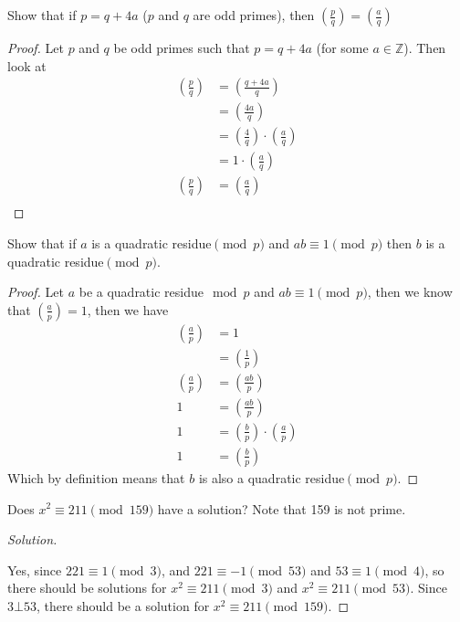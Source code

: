 \documentclass[11pt]{article}
\newcommand{\Z}{\mathbb{Z}}
\newcommand\leg[2]{\left(\frac{#1}{#2}\right)}
\newenvironment{problem}[2][Problem]{\begin{trivlist}
\item[\hskip \labelsep {\bfseries #1}\hskip \labelsep {\bfseries #2.}]}{\end{trivlist}}
\newenvironment{solution}
  {\renewcommand\qedsymbol{$~$}\begin{proof}[Solution]$ $\par\nobreak\ignorespaces}
  {\end{proof}}
\begin{document}
\begin{problem}{11}
Show that if $p=q+4a$ ($p$ and $q$  are odd primes), then $\leg{p}{q}=\leg{a}{q}$
\end{problem}

\begin{proof}
  Let $p$ and $q$ be odd primes such that $p=q+4a$ (for some $a\in \Z$). Then look at
  \begin{align*}
    \leg{p}{q} & = \leg{q+4a}{q}               \\
               & = \leg{4a}{q}                 \\
               & = \leg{4}{q} \cdot \leg{a}{q} \\
               & = 1 \cdot \leg{a}{q}          \\
    \leg{p}{q} & = \leg{a}{q}                  \\
  \end{align*}
\end{proof}



\begin{problem}{16}
Show that if $a$ is a quadratic residue$\pmod{p}$ and $ab\equiv 1\pmod{p}$ then $b$ is a quadratic residue$\pmod{p}$.
\end{problem}

\begin{proof}
  Let $a$ be a quadratic residue$\mod{p}$ and $ab\equiv 1 \pmod{p}$, then we know that $\leg{a}{p}=1$, then we have
  \begin{align*}
    \leg{a}{p} & = 1                           \\
               & = \leg{1}{p}                  \\
    \leg{a}{p} & = \leg{ab}{p}                 \\
    1          & = \leg{ab}{p}                 \\
    1          & = \leg{b}{p} \cdot \leg{a}{p} \\
    1          & = \leg{b}{p}
  \end{align*}
  Which by definition means that $b$ is also a quadratic residue$\pmod{p}$.
\end{proof}



\begin{problem}{17}
Does $x^2\equiv 211\pmod{159}$ have a solution? Note that 159 is not prime.
\end{problem}

\begin{solution}
  Yes, since $221\equiv 1 \pmod{3}$, and $221\equiv -1 \pmod{53}$ and $53\equiv 1\pmod{4}$, so there should be solutions for $x^2\equiv 211 \pmod{3}$ and $x^2\equiv 211 \pmod{53}$. Since $3\bot 53$, there should be a solution for $x^2 \equiv 211 \pmod{159}$.
\end{solution}
\end{document}
